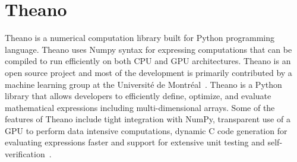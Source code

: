\section{Theano}

Theano is a numerical computation library built for Python programming language. Theano uses Numpy syntax for expressing computations that can be compiled to run efficiently on both CPU and GPU architectures. Theano is an open source project and most of the development is primarily contributed by a machine learning group at the Université de Montréal~\cite{hid-sp18-510-wiki-theano}. Theano is a Python library that allows developers to efficiently define, optimize, and evaluate mathematical expressions including multi-dimensional arrays. Some of the features of Theano include tight integration with NumPy, transparent use of a GPU to perform data intensive computations, dynamic C code generation for evaluating expressions faster and support for extensive unit testing and self-verification~\cite{hid-sp18-510-web-theano}.
